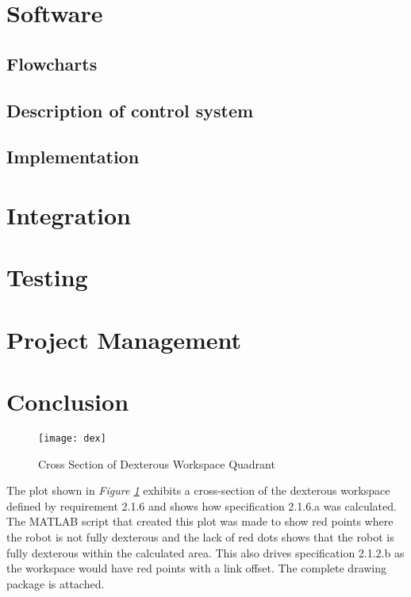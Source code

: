 \section{Software}
\subsection*{Flowcharts}

\subsection*{Description of control system}

\subsection*{Implementation}

\section*{Integration}

\section{Testing}

\section{Project Management}

\section{Conclusion}


\nocite{*}

\raggedright
\titlespacing*{\chapter}{0pt}{-10pt}{40pt}
\newpage
\newpage
\appendix
\renewcommand\thesection{\Roman{section}}
\renewcommand\thesubsection{\roman{subsection}}
\label{sec:app}
\begin{figure}[htp]
  \centering
  \texttt{[image: dex]}
  \caption{Cross Section of Dexterous Workspace Quadrant}
  \label{fig:dex2}
\end{figure}
The plot shown in \emph{Figure \ref{fig:dex2}} exhibits a cross-section of the dexterous workspace defined by requirement 2.1.6 and shows how specification 2.1.6.a was calculated. The MATLAB script that created this plot was made to show red points where the robot is not fully dexterous and the lack of red dots shows that the robot is fully dexterous within the calculated area. This also drives specification 2.1.2.b as the workspace would have red points with a link offset.\newpage
{}
The complete drawing package is attached.



\vspace{10ex}

